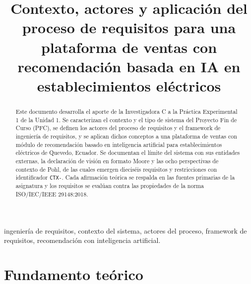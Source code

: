 \documentclass[onecolumn,12pt]{IEEEtran}
\begin{document}
\renewcommand{\tablename}{Tabla}
\renewcommand{\figurename}{Figura}
\nocite{iso29148,iso15288,iso12207,iso25010,pohl2025,swebok4,pmbok7,ireb2023,moore,mavin2009}

\title{Contexto, actores y aplicaci\'on del proceso de requisitos para una plataforma de ventas con recomendaci\'on basada en IA en establecimientos el\'ectricos}

\author{
}

\maketitle

\begin{abstract}
Este documento desarrolla el aporte de la Investigadora C a la Pr\'actica Experimental 1 de la Unidad 1. Se caracterizan el contexto y el tipo de sistema del Proyecto Fin de Curso (PFC), se definen los actores del proceso de requisitos y el framework de ingenier\'ia de requisitos, y se aplican dichos conceptos a una plataforma de ventas con m\'odulo de recomendaci\'on basado en inteligencia artificial para establecimientos el\'ectricos de Quevedo, Ecuador. Se documentan el l\'imite del sistema con sus entidades externas, la declaraci\'on de visi\'on en formato Moore y las ocho perspectivas de contexto de Pohl, de las cuales emergen diecis\'eis requisitos y restricciones con identificador \texttt{CTX-}. Cada afirmaci\'on te\'orica se respalda en las fuentes primarias de la asignatura y los requisitos se eval\'uan contra las propiedades de la norma ISO/IEC/IEEE 29148:2018.
\end{abstract}

\begin{IEEEkeywords}
ingenier\'ia de requisitos, contexto del sistema, actores del proceso, framework de requisitos, recomendaci\'on con inteligencia artificial.
\end{IEEEkeywords}

\section{Fundamento te\'orico}
\end{document}
